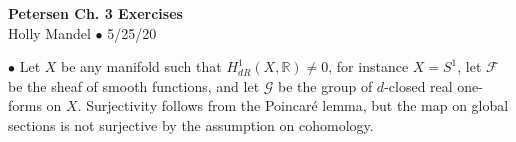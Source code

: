 \documentclass[10pt,letter]{article}
\begin{document}
\begin{center} 
{\bf Petersen Ch. 3 Exercises} \\
Holly Mandel $\bullet$ 5/25/20
\end{center}
 $\bullet$ Let $X$ be any manifold such that $H^1_{dR}(X,\mathbb{R}) \neq 0$, for instance $X = S^1$, let $\mathcal{F}$ be the sheaf of smooth functions, and let $\mathcal{G}$ be the group of $d$-closed real one-forms on $X$. Surjectivity follows from the Poincar\'e lemma, but the map on global sections is not surjective by the assumption on cohomology. \\
 
\end{document}
